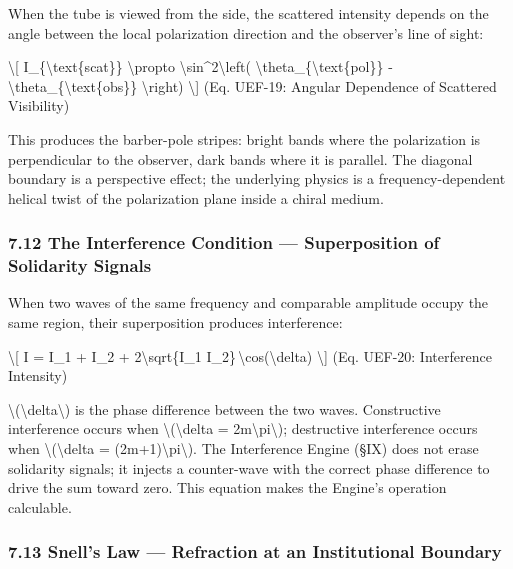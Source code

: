 {When the tube is viewed from the side, the scattered intensity depends on the angle between the local polarization direction and the observer's line of sight:

\textbackslash{[}
I_\{\textbackslash text\{scat\}\} \textbackslash propto \textbackslash sin^2\textbackslash left( \textbackslash theta_\{\textbackslash text\{pol\}\} - \textbackslash theta_\{\textbackslash text\{obs\}\} \textbackslash right)
\label{eq:uef-19}
\textbackslash{]} {(Eq. UEF-19: Angular Dependence of Scattered Visibility)}

This produces the barber-pole stripes: bright bands where the polarization is perpendicular to the observer, dark bands where it is parallel. The diagonal boundary is a perspective effect; the underlying physics is a frequency-dependent helical twist of the polarization plane inside a chiral medium.

\protect{}
\subsubsection{7.12 The Interference Condition --- Superposition of Solidarity Signals}\label{the-interference-condition-superposition-of-solidarity-signals}

When two waves of the same frequency and comparable amplitude occupy the same region, their superposition produces interference:

\textbackslash{[}
I = I_1 + I_2 + 2\textbackslash sqrt\{I_1 I_2\}\,\textbackslash cos(\textbackslash delta)
\label{eq:uef-20}
\textbackslash{]} {(Eq. UEF-20: Interference Intensity)}

\textbackslash(\textbackslash delta\textbackslash) is the phase difference between the two waves. Constructive interference occurs when \textbackslash(\textbackslash delta = 2m\textbackslash pi\textbackslash); destructive interference occurs when \textbackslash(\textbackslash delta = (2m+1)\textbackslash pi\textbackslash). The Interference Engine (§IX) does not erase solidarity signals; it injects a counter-wave with the correct phase difference to drive the sum toward zero. This equation makes the Engine's operation calculable.

\protect{}
\subsubsection{7.13 Snell's Law --- Refraction at an Institutional Boundary}\label{snells-law-refraction-at-an-institutional-boundary}

}
